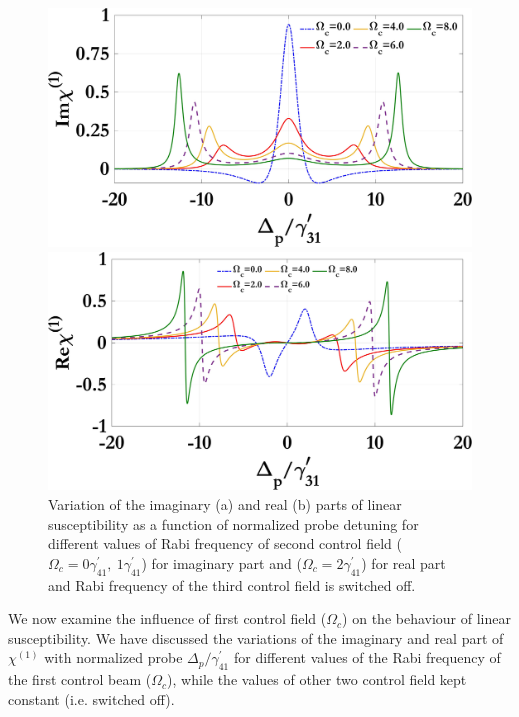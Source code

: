 \documentclass[12pt,a4paper]{article}
\begin{document}
\begin{figure}[ht]
  \centering
  \begin{minipage}{0.48\textwidth}
    \centering
    \includegraphics[width=\linewidth]{Plots/Img_chi1_Omega_c.jpeg}
    \subcaption{}
  \end{minipage}%
  \hfill
  \begin{minipage}{0.48\textwidth}
    \centering
    \includegraphics[width=\linewidth]{Plots/Real_chi1_Omega_c.jpeg}
    \subcaption{}
  \end{minipage}
  \caption{Variation of the imaginary (a) and real (b) parts of linear susceptibility as a function of normalized probe detuning for different values of Rabi frequency of second control field ($\Omega_c=0\gamma^{\prime}_{41},\ 1\gamma^{\prime}_{41}$) for imaginary part and ($\Omega_c=2\gamma^{\prime}_{41}$) for real part and Rabi frequency of the third control field is switched off.}
  \label{fig:omegac}
\end{figure}

We now examine the influence of first control field ($\Omega_{c}$) on the behaviour of linear susceptibility. We have discussed the variations of the imaginary and real part of $\chi^{(1)}$ with normalized probe $\Delta_{p}/\gamma^{\prime}_{41}$ for different values of the Rabi frequency of the first control beam ($\Omega_c$), while the values of other two control field kept constant (i.e. switched off).
\end{document}
